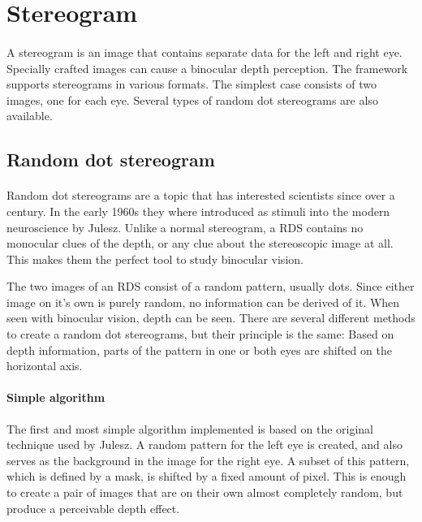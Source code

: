 \section{Stereogram}
\paragraph{}
A stereogram is an image that contains separate data for the left and right eye. Specially crafted images can cause a binocular depth perception. The framework supports stereograms in various formats. The simplest case consists of two images, one for each eye. Several types of random dot stereograms are also available.

\subsection{Random dot stereogram\label{RDS}}
\paragraph{}
Random dot stereograms are a topic that has interested scientists since over a century\cite{AntRDS}. In the early 1960s they where introduced as stimuli into the modern neuroscience by Julesz\cite{BellRDS}. Unlike a normal stereogram, a RDS contains no monocular clues of the depth, or any clue about the stereoscopic image at all. This makes them the perfect tool to study binocular vision.

The two images of an RDS consist of a random pattern, usually dots. Since either image on it's own is purely random, no information can be derived of it. When seen with binocular vision, depth can be seen. There are several different methods to create a random dot stereograms, but their principle is the same:
Based on depth information, parts of the pattern in one or both eyes are shifted on the horizontal axis.

\paragraph{Simple algorithm}
The first and most simple algorithm implemented is based on the original technique used by Julesz\cite{BellRDS}. A random pattern for the left eye is created, and also serves as the background in the image for the right eye. A subset of this pattern, which is defined by a mask, is shifted by a fixed amount of pixel. This is enough to create a pair of images that are on their own almost completely random, but produce a perceivable depth effect.

